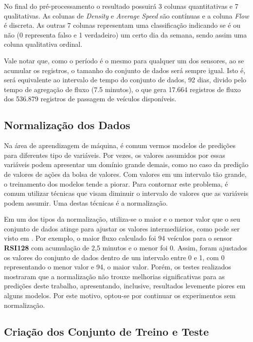 No final do pré-processamento o resultado possuirá 3 colunas quantitativas e 7 qualitativas. As colunas de \textit{Density} e \textit{Average Speed} são contínuas e a coluna \textit{Flow} é discreta. As outras 7 colunas representam uma classificação indicando se é ou não (0 representa falso e 1 verdadeiro) um certo dia da semana, sendo assim uma coluna qualitativa ordinal.

Vale notar que, como o período é o mesmo para qualquer um dos sensores, ao se acumular os registros, o tamanho do conjunto de dados será sempre igual. Isto é, será equivalente ao intervalo de tempo do conjunto de dados, 92 dias, divido pelo tempo de agregação de fluxo (7.5 minutos), o que gera 17.664 registros de fluxo dos 536.879 registros de passagem de veículos disponíveis.

\subsection{Normalização dos Dados}
Na área de aprendizagem de máquina, é comum vermos modelos de predições para diferentes tipo de variáveis. Por vezes, os valores assumidos por essas variáveis podem apresentar um domínio grande demais, como no caso da predição de valores de ações da bolsa de valores. Com valores em um intervalo tão grande, o treinamento dos modelos tende a piorar. Para contornar este problema, é comum utilizar técnicas que visam diminuir o intervalo de valores que as variáveis podem assumir. Uma destas técnicas é a normalização. 

Em um dos tipos da normalização, utiliza-se o maior e o menor valor que o seu conjunto de dados atinge para ajustar os valores intermediários, como pode ser visto em \cite{Dorian_1999}. Por exemplo, o maior fluxo calculado foi 94 veículos para o sensor \textbf{RSI128} com acumulação de 2,5 minutos e o menor foi 0. Assim, foram ajustados os valores do conjunto de dados dentro de um intervalo entre 0 e 1, com 0 representando o menor valor e 94, o maior valor. Porém, os testes realizados mostraram que a normalização não trouxe melhorias significativas para as predições deste trabalho, apresentando, inclusive, resultados levemente piores em alguns modelos. Por este motivo, optou-se por continuar os experimentos sem normalização.

\subsection{Criação dos Conjunto de Treino e Teste}

